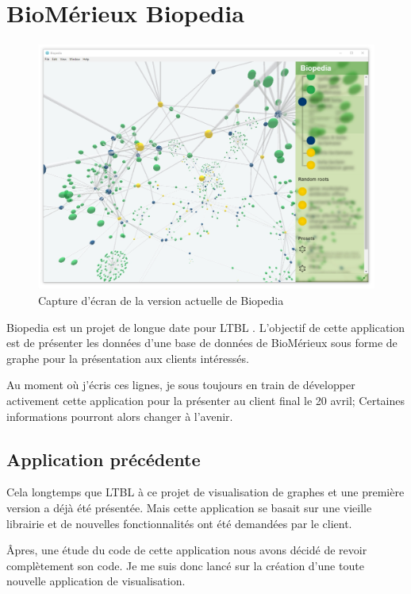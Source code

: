 \section{BioMérieux Biopedia}
\label{biomerieuxBiopedia}

\begin{figure}[h]
    \centering
    \includegraphics[scale=0.35]{img/Biopedia.jpg}
    \caption{Capture d'écran de la version actuelle de Biopedia}
\end{figure}

Biopedia est un projet de longue date pour LTBL .
L'objectif de cette application est de présenter les données d'une base de données de BioMérieux sous forme de graphe pour la présentation aux clients intéressés.

Au moment où j'écris ces lignes, je sous toujours en train de développer activement cette application pour la présenter au client final le 20 avril;
Certaines informations pourront alors changer à l'avenir.

\subsection{Application précédente}
\label{biomerieuxBiopediaApplicationPrécédente}

Cela longtemps que LTBL à ce projet de visualisation de graphes et une première version a déjà été présentée.
Mais cette application se basait sur une vieille librairie et de nouvelles fonctionnalités ont été demandées par le client.

Âpres, une étude du code de cette application nous avons décidé de revoir complètement son code.
Je me suis donc lancé sur la création d'une toute nouvelle application de visualisation.

